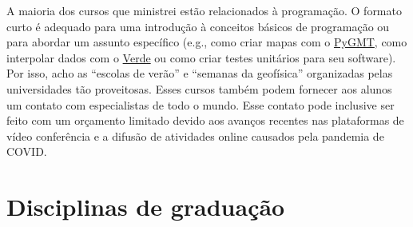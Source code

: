 \documentclass[10pt,a4paper,oneside]{book}
\begin{document}
A maioria dos cursos que ministrei estão relacionados à programação. O formato
curto é adequado para uma introdução à conceitos básicos de programação ou
para abordar um assunto específico (e.g., como criar mapas com o
\href{https://www.pygmt.org}{PyGMT},
como interpolar dados com o \href{https://www.fatiando.org/verde}{Verde}
ou como criar testes unitários para seu software).
Por isso, acho as ``escolas de verão'' e ``semanas da geofísica'' organizadas
pelas universidades tão proveitosas.
Esses cursos também podem fornecer aos alunos um contato com especialistas de
todo o mundo.
Esse contato pode inclusive ser feito com um orçamento limitado
devido aos avanços recentes nas plataformas de vídeo conferência e a difusão de
atividades online causados pela pandemia de COVID.


\section{Disciplinas de graduação}
\label{sec_ensino_grad}
\end{document}
